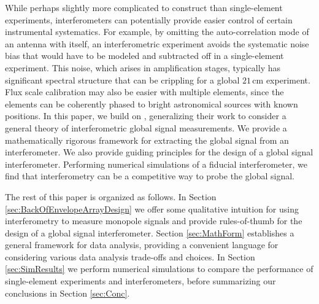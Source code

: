 \documentclass[twocolumn,apj,numberedappendix]{emulateapj}
\newcommand{\mep}[1]{}
\begin{document}
While perhaps slightly more complicated to construct than single-element experiments, interferometers can potentially provide easier control of certain instrumental systematics. For example, by omitting the auto-correlation mode of an antenna with itself, an interferometric experiment avoids the systematic noise bias that would have to be modeled and subtracted off in a single-element experiment. This noise, which arises in amplification stages, typically has significant spectral structure that can be crippling for a global $21\,\textrm{cm}$ experiment. Flux scale calibration may also be easier with multiple elements, since the elements can be coherently phased to bright astronomical sources with known positions. In this paper, we build on \citet{VedanthamLOFAR2}, generalizing their work to consider a general theory of interferometric global signal measurements.  We provide a mathematically rigorous framework for extracting the global signal from an interferometer. We also provide guiding principles for the design of a global signal interferometer. Performing numerical simulations of a fiducial interferometer, we find that interferometry can be a competitive way to probe the global signal.


The rest of this paper is organized as follows.  In Section \ref{sec:BackOfEnvelopeArrayDesign} we offer some qualitative intuition for using interferometry to measure monopole signals and provide rules-of-thumb for the design of a global signal interferometer. Section \ref{sec:MathForm} establishes a general framework for data analysis, providing a convenient language for considering various data analysis trade-offs and choices. In Section \ref{sec:SimResults} we perform numerical simulations to compare the performance of single-element experiments and interferometers, before summarizing our conclusions in Section \ref{sec:Conc}.

\end{document}

